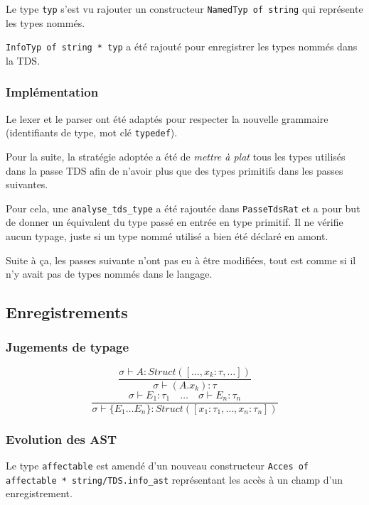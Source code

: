 \documentclass[headings=standardclasses,parskip=half]{scrartcl}
\begin{document}
Le type \texttt{typ} s'est vu rajouter un constructeur
\texttt{NamedTyp of string} qui représente les types nommés.

\texttt{InfoTyp of string * typ} a été rajouté pour enregistrer
les types nommés dans la TDS.

\subsubsection*{Implémentation}

Le lexer et le parser ont été adaptés pour respecter la nouvelle
grammaire (identifiants de type, mot clé \texttt{typedef}).

Pour la suite, la stratégie adoptée a été de \textit{mettre à plat}
tous les types utilisés dans la passe TDS afin de n'avoir plus que
des types primitifs dans les passes suivantes.

Pour cela, une \texttt{analyse\_tds\_type} a été rajoutée dans
\texttt{PasseTdsRat} et a pour but de donner un équivalent du type
passé en entrée en type primitif.
Il ne vérifie aucun typage, juste si un type nommé utilisé a bien été
déclaré en amont.

Suite à ça, les passes suivante n'ont pas eu à être modifiées, tout
est comme si il n'y avait pas de types nommés dans le langage.

\subsection{Enregistrements}

\subsubsection*{Jugements de typage}

\[\frac{\sigma \vdash A : Struct([\dots, x_k : \tau, \dots])}
    {\sigma \vdash (A.x_k) : \tau}\]
\[\frac{\sigma \vdash E_1 : \tau_1 \quad
        \dots \quad \sigma \vdash E_n : \tau_n}
    {\sigma \vdash \{E_1 \dots E_n \} :
        Struct([x_1 : \tau_1, \dots, x_n : \tau_n])}\]

\subsubsection*{Evolution des AST}

Le type \texttt{affectable} est amendé d'un nouveau constructeur
\texttt{Acces of affectable * string/TDS.info\_ast} représentant les
accès à un champ d'un enregistrement.
\end{document}
